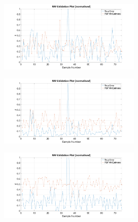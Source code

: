\begin{figure}
  \begin{subfigure}{0.48\textwidth}
    \begin{subfigure}{\textwidth}
      \includegraphics[clip, trim = 100 0 100 0, width=\textwidth]{figures/chapter4/v_x}
    \end{subfigure}
    \begin{subfigure}{\textwidth}
      \includegraphics[clip, trim = 100 0 100 0, width=\textwidth]{figures/chapter4/v_y}
    \end{subfigure}
    \begin{subfigure}{\textwidth}
      \includegraphics[clip, trim = 100 0 100 0, width=\textwidth]{figures/chapter4/v_z}

\end{subfigure}
\end{subfigure}
\end{figure}
